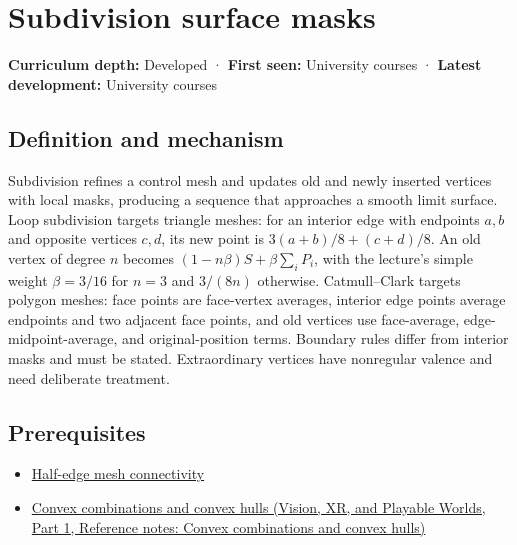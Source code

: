 \hypertarget{appendix-0234ab7f86b1}{}\label{referencestart:appendix-0234ab7f86b1}
\section{Subdivision surface masks}\label{appendix-0234ab7f86b1-subdivision-surface-masks}

\hypertarget{appendix-0234ab7f86b1-subdivision-surface-masks}{}

\textbf{Curriculum depth:} Developed · \textbf{First seen:} University courses · \textbf{Latest development:} University courses

\begin{allmightroledefinition}

\subsection{Definition and mechanism}\label{appendix-0234ab7f86b1-definition-and-mechanism}

\hypertarget{appendix-0234ab7f86b1-definition-and-mechanism}{}

Subdivision refines a control mesh and updates old and newly inserted vertices with local masks, producing a sequence that approaches a smooth limit surface. Loop subdivision targets triangle meshes: for an interior edge with endpoints \(a,b\) and opposite vertices \(c,d\), its new point is \(3(a+b)/8+(c+d)/8\). An old vertex of degree \(n\) becomes \((1-n\beta)S+\beta\sum_iP_i\), with the lecture's simple weight \(\beta=3/16\) for \(n=3\) and \(3/(8n)\) otherwise. Catmull--Clark targets polygon meshes: face points are face-vertex averages, interior edge points average endpoints and two adjacent face points, and old vertices use face-average, edge-midpoint-average, and original-position terms. Boundary rules differ from interior masks and must be stated. Extraordinary vertices have nonregular valence and need deliberate treatment.

\end{allmightroledefinition}

\subsection{Prerequisites}\label{appendix-0234ab7f86b1-prerequisites}

\hypertarget{appendix-0234ab7f86b1-prerequisites}{}

\begin{itemize}
\tightlist
\item
  \hyperref[appendix-1aea26b2307f]{Half-edge mesh connectivity}
\item
  \href{../07-Vision-XR-and-Playable-Worlds-P01/main.pdf\#appendix-0026ec42c9d5}{Convex combinations and convex hulls (Vision, XR, and Playable Worlds, Part 1, Reference notes: Convex combinations and convex hulls)}
\end{itemize}

